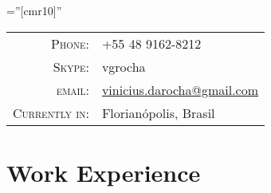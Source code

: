 \documentclass[a4paper,10pt]{article} %
\begin{document}
\pagestyle{empty} %

\font\fb=''[cmr10]'' %


\par{\bigskip\par} %


\begin{tabular}{rl}
  \textsc{Phone:} &
  +55 48 9162-8212\\

  \textsc{Skype:} &
  vgrocha\\
  
\textsc{email:} &
\href{mailto:vinicius.darocha@gmail.com}{vinicius.darocha@gmail.com} \\

\textsc{Currently in:} &
Florianópolis, Brasil 

\end{tabular}


\section{Work Experience}
\end{document}
